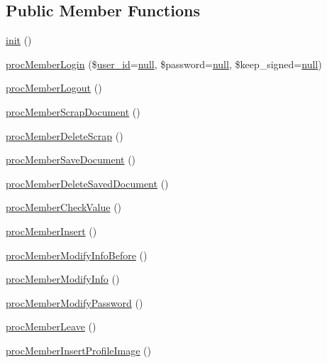 \subsection*{Public Member Functions}
\begin{DoxyCompactItemize}
\item 
\hyperlink{classmemberController_a1de8a45f3b986e23bbf60d685f8d779d}{init} ()
\item 
\hyperlink{classmemberController_a1e37a85198193c84a66b4472a677960d}{proc\+Member\+Login} (\$\hyperlink{ko_8install_8php_a74f1a394389d774e5b4cd5d1d15413f7}{user\+\_\+id}=\hyperlink{modernizr_8min_8js_a286f9ec831c5e676eeb493248eab9575}{null}, \$password=\hyperlink{modernizr_8min_8js_a286f9ec831c5e676eeb493248eab9575}{null}, \$keep\+\_\+signed=\hyperlink{modernizr_8min_8js_a286f9ec831c5e676eeb493248eab9575}{null})
\item 
\hyperlink{classmemberController_a9b27cafc18ca21df327c49842987c829}{proc\+Member\+Logout} ()
\item 
\hyperlink{classmemberController_a7c582f99e2bda6a956a7a2a33a01c6c6}{proc\+Member\+Scrap\+Document} ()
\item 
\hyperlink{classmemberController_ae1eb0a3ef4da18d06c4fce0dc4fbbe24}{proc\+Member\+Delete\+Scrap} ()
\item 
\hyperlink{classmemberController_abe77500da26f14cd629ca373f94e04d1}{proc\+Member\+Save\+Document} ()
\item 
\hyperlink{classmemberController_a4e154a138901b9b941f9949576c47f00}{proc\+Member\+Delete\+Saved\+Document} ()
\item 
\hyperlink{classmemberController_ac9e9ed09b49a295c94a4c3bad239757f}{proc\+Member\+Check\+Value} ()
\item 
\hyperlink{classmemberController_a8f176054f72833b01e2229108da0b599}{proc\+Member\+Insert} ()
\item 
\hyperlink{classmemberController_ac7a79ff38569abb383495b4d796eba69}{proc\+Member\+Modify\+Info\+Before} ()
\item 
\hyperlink{classmemberController_abe0dc1c6680e07a0189e53a10a7651f2}{proc\+Member\+Modify\+Info} ()
\item 
\hyperlink{classmemberController_ae62edfe1a880c94c02fba4c04b22add3}{proc\+Member\+Modify\+Password} ()
\item 
\hyperlink{classmemberController_a4c78a9114c62d27178d70bb4b8d19455}{proc\+Member\+Leave} ()
\item 
\hyperlink{classmemberController_ac8b43955581e87f21c77ee741f633a66}{proc\+Member\+Insert\+Profile\+Image} ()

\end{DoxyCompactItemize}
